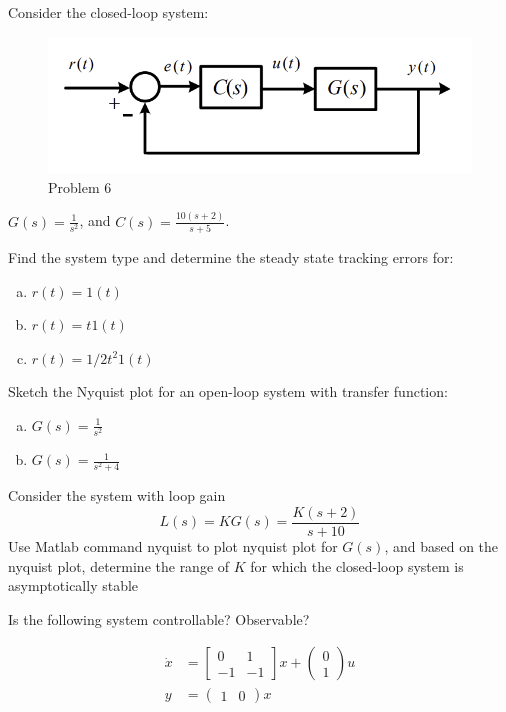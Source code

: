 \documentclass[11pt]{article}
\begin{document}

Consider the closed-loop system:
\begin{figure}[h] 
    \centering
    \includegraphics[width=0.55 \linewidth]{prob6}
    \caption{Problem 6}
    \label{fig:p6}
\end{figure}

$G(s) = \frac{1}{s^2}$, and $C(s) = \frac{10(s+2)}{s+5}$.

Find the system type and determine the steady state tracking errors for:

\begin{enumerate}[a)]
    \item $r(t) = 1(t)$
    \item $r(t) = t1(t)$
    \item $r(t) = 1/2 t^2 1(t)$
\end{enumerate}

\soln




Sketch the Nyquist plot for an open-loop system with transfer function:
\begin{enumerate}[a)]
    \item $G(s) = \frac{1}{s^2}$
    \item $G(s) = \frac{1}{s^2 + 4}$
\end{enumerate}

\soln







Consider the system with loop gain
$$
L(s) = KG(s) = \frac{K(s+2)}{s+10}
$$
Use Matlab command nyquist to plot nyquist plot for $G(s)$, and based
on the nyquist plot, determine the range of $K$ for which the closed-loop system is asymptotically stable
\soln




Is the following system controllable? Observable?

\begin{align*}
    \dot{x} &= \begin{bmatrix}
        0 & 1 \\ -1 & -1
    \end{bmatrix} x + \begin{pmatrix}
        0 \\ 1
    \end{pmatrix} u \\
    y &= \begin{pmatrix}
        1 & 0
    \end{pmatrix} x
\end{align*}

\soln
\end{document}
